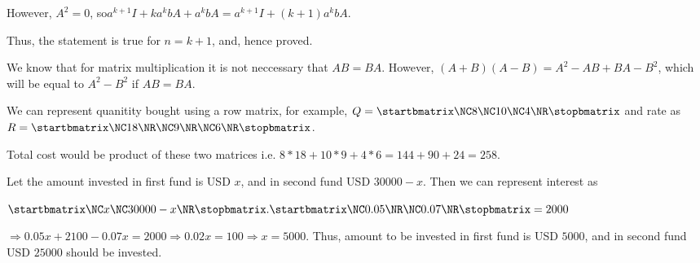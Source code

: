   However, $A^2 = 0$, so$a^{k + 1}I + ka^kbA + a^kbA = a^{k + 1}I + (k + 1)a^kbA$.

  Thus, the statement is true for $n = k + 1$, and, hence proved.
\item We know that for matrix multiplication it is not neccessary that $AB = BA$. However, $(A + B)(A - B) =
  A^2 - AB + BA - B^2$, which will be equal to $A^2 - B^2$ if $AB = BA$.
\item We can represent quanitity bought using a row matrix, for example, $Q = \startbmatrix\NC 8\NC 10\NC
  4\NR\stopbmatrix$ and rate as $R = \startbmatrix\NC18\NR\NC 9\NR\NC 6\NR\stopbmatrix$.

  Total cost would be product of these two matrices i.e. $8*18 + 10*9 + 4*6 = 144 + 90 + 24 = 258$.
\item Let the amount invested in first fund is USD $x$, and in second fund USD $30000 - x$. Then we can
  represent interest as

  $\startbmatrix\NC x\NC 30000 - x\NR\stopbmatrix.\startbmatrix\NC 0.05\NR\NC 0.07\NR\stopbmatrix = 2000$

  $\Rightarrow 0.05x + 2100 - 0.07x = 2000 \Rightarrow 0.02x = 100 \Rightarrow x = 5000$. Thus, amount to be
  invested in first fund is USD $5000$, and in second fund USD $25000$ should be invested.
\item 
\stopitemize
